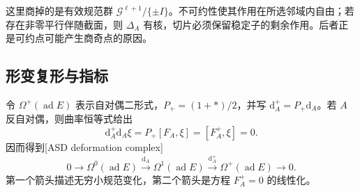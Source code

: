 这里商掉的是有效规范群 \(\mathcal G^{\ell+1}/\{\pm I\}\)。不可约性使其作用在所选邻域内自由；若存在非零平行伴随截面，则 \(\Delta_A\) 有核，切片必须保留稳定子的剩余作用。后者正是可约点可能产生商奇点的原因。

\subsection{形变复形与指标}
\label{g3:subsec:B02:02}
令 \(\Omega^+(\operatorname{ad}E)\) 表示自对偶二形式，\(P_+=(1+*)/2\)，并写 \(\mathrm d_A^+=P_+\mathrm d_A\)。若 \(A\) 反自对偶，则曲率恒等式给出
\begin{equation}\label{g3:eq:B-asd-complex-identity}
 \mathrm d_A^+\mathrm d_A\xi=P_+[F_A,\xi]=[F_A^+,\xi]=0.
\end{equation}
因而得到[ASD deformation complex]
\begin{equation}\label{g3:eq:B-asd-deformation-complex}
 0\longrightarrow\Omega^0(\operatorname{ad}E)
 \xrightarrow{\mathrm d_A}\Omega^1(\operatorname{ad}E)
 \xrightarrow{\mathrm d_A^+}\Omega^+(\operatorname{ad}E)
 \longrightarrow0.
\end{equation}
第一个箭头描述无穷小规范变化，第二个箭头是方程 \(F_A^+=0\) 的线性化。

